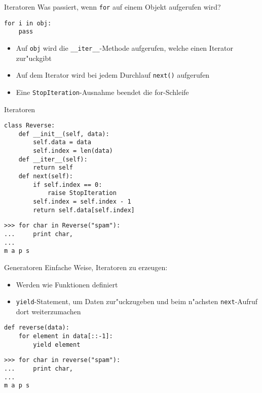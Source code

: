 \begin{frame}[fragile]{Iteratoren}
Was passiert, wenn \lstinline{for} auf einem Objekt aufgerufen wird?
\begin{lstlisting}[style=Python]
for i in obj:
    pass
\end{lstlisting}
\begin{itemize}
\item Auf \lstinline{obj} wird die \lstinline{__iter__}-Methode aufgerufen, welche einen \alert{Iterator} zur"uckgibt
\item Auf dem Iterator wird bei jedem Durchlauf \alert{\lstinline{next()}} aufgerufen
\item Eine \lstinline{StopIteration}-Ausnahme beendet die for-Schleife
\end{itemize}
\end{frame}

\begin{frame}[fragile]{Iteratoren}
\begin{lstlisting}[style=Python]
class Reverse:
    def __init__(self, data):
        self.data = data
        self.index = len(data)
    def __iter__(self):
        return self
    def next(self):
        if self.index == 0:
            raise StopIteration
        self.index = self.index - 1
        return self.data[self.index]
\end{lstlisting}
\begin{lstlisting}[style=Shell]
>>> for char in Reverse("spam"):
...     print char,
...
m a p s
\end{lstlisting}
\end{frame}

\begin{frame}[fragile]{Generatoren}
Einfache Weise, Iteratoren zu erzeugen:
\begin{itemize}
\item Werden wie Funktionen definiert
\item \lstinline{yield}-Statement, um Daten zur"uckzugeben und beim n"achsten \lstinline{next}-Aufruf dort weiterzumachen
\end{itemize}
\begin{lstlisting}[style=Python]
def reverse(data):
    for element in data[::-1]:
        yield element
\end{lstlisting}
\begin{lstlisting}[style=Shell]
>>> for char in reverse("spam"):
...     print char,
...
m a p s
\end{lstlisting}
\end{frame}

